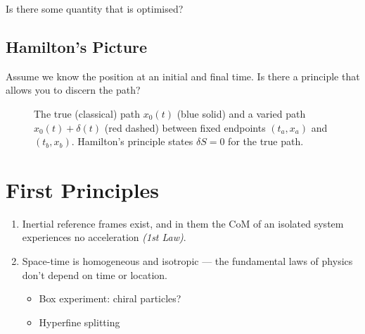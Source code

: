 Is there some quantity that is optimised?

\subsection{Hamilton's Picture}

Assume we know the position at an initial and final time.  Is there a principle
that allows you to discern the path?

\begin{figure}[H]
\begin{center}
\end{center}
\caption{The true (classical) path $x_0(t)$ (blue solid) and a varied path $x_0(t)+\delta(t)$ (red dashed) between fixed endpoints $(t_a,x_a)$ and $(t_b,x_b)$. Hamilton's principle states $\delta S = 0$ for the true path.}
\label{fig:action_paths}
\end{figure}

\section{First Principles}

\begin{enumerate}
    \item Inertial reference frames exist, and in them the CoM of an isolated system
        experiences no acceleration \textit{(1st Law)}.
    \item Space-time is homogeneous and isotropic — the fundamental laws of physics
        don't depend on time or location.
        \begin{itemize}
            \item Box experiment: chiral particles?
            \item Hyperfine splitting
        \end{itemize}
\end{enumerate}

